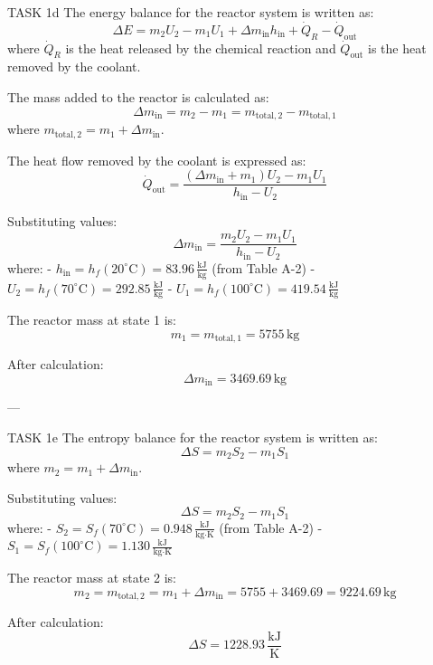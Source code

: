 TASK 1d  
The energy balance for the reactor system is written as:  
\[
\Delta E = m_2 U_2 - m_1 U_1 + \Delta m_{\text{in}} h_{\text{in}} + \dot{Q}_{R} - \dot{Q}_{\text{out}}
\]  
where \( \dot{Q}_{R} \) is the heat released by the chemical reaction and \( \dot{Q}_{\text{out}} \) is the heat removed by the coolant.  

The mass added to the reactor is calculated as:  
\[
\Delta m_{\text{in}} = m_2 - m_1 = m_{\text{total},2} - m_{\text{total},1}
\]  
where \( m_{\text{total},2} = m_1 + \Delta m_{\text{in}} \).  

The heat flow removed by the coolant is expressed as:  
\[
\dot{Q}_{\text{out}} = \frac{(\Delta m_{\text{in}} + m_1) U_2 - m_1 U_1}{h_{\text{in}} - U_2}
\]  

Substituting values:  
\[
\Delta m_{\text{in}} = \frac{m_2 U_2 - m_1 U_1}{h_{\text{in}} - U_2}
\]  
where:  
- \( h_{\text{in}} = h_f(20^\circ\text{C}) = 83.96 \, \frac{\text{kJ}}{\text{kg}} \) (from Table A-2)  
- \( U_2 = h_f(70^\circ\text{C}) = 292.85 \, \frac{\text{kJ}}{\text{kg}} \)  
- \( U_1 = h_f(100^\circ\text{C}) = 419.54 \, \frac{\text{kJ}}{\text{kg}} \)  

The reactor mass at state 1 is:  
\[
m_1 = m_{\text{total},1} = 5755 \, \text{kg}
\]  

After calculation:  
\[
\Delta m_{\text{in}} = 3469.69 \, \text{kg}
\]  

---

TASK 1e  
The entropy balance for the reactor system is written as:  
\[
\Delta S = m_2 S_2 - m_1 S_1
\]  
where \( m_2 = m_1 + \Delta m_{\text{in}} \).  

Substituting values:  
\[
\Delta S = m_2 S_2 - m_1 S_1
\]  
where:  
- \( S_2 = S_f(70^\circ\text{C}) = 0.948 \, \frac{\text{kJ}}{\text{kg·K}} \) (from Table A-2)  
- \( S_1 = S_f(100^\circ\text{C}) = 1.130 \, \frac{\text{kJ}}{\text{kg·K}} \)  

The reactor mass at state 2 is:  
\[
m_2 = m_{\text{total},2} = m_1 + \Delta m_{\text{in}} = 5755 + 3469.69 = 9224.69 \, \text{kg}
\]  

After calculation:  
\[
\Delta S = 1228.93 \, \frac{\text{kJ}}{\text{K}}
\]  